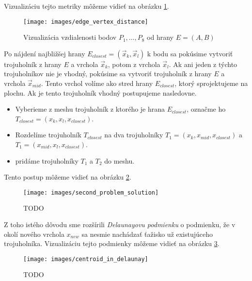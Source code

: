 \begin{enumerate}
{\begin{definition}
    \end{definition}

    Vizualizáciu tejto metriky môžeme vidieť na obrázku \ref{obr:edge_vertex_distance}.

    \begin{figure}
        \centerline{\texttt{[image: images/edge\_vertex\_distance]}}
        \caption[Vizualizácia vzdialenosti bodov $P_1, ..., P_8$ od hrany $E=(A,B)$]
        {Vizualizácia vzdialenosti bodov $P_1, ..., P_8$ od hrany $E=(A,B)$}
        \label{obr:edge_vertex_distance}
    \end{figure}

    Po nájdení najbližšej hrany $E_{closest} = (\overrightarrow{x}_k, \overrightarrow{x}_l)$ 
    k bodu sa pokúsime vytvoriť trojuholník z hrany $E$ a vrchola $\overrightarrow{x}_k$, potom z
    vrchola $\overrightarrow{x}_l$. Ak ani jeden z týchto trojuholníkov nie je vhodný, pokúsime sa 
    vytvoriť trojuholník z hrany $E$ a vrchola $\overrightarrow{x}_{mid}$. Tento vrchol 
    volíme ako stred hrany $E_{closest}$, ktorý sprojektujeme na plochu. Ak je tento trojuholník vhodný
    postupujeme nasledovne. 
    
    \begin{itemize}
    \item{
        Vyberieme z meshu trojuholník z ktorého je hrana $E_{closest}$, označme ho 
        $T_{closest}=(x_k, x_l, x_{closest})$.
    }
    \item{
        Rozdelíme trojuholník $T_{closest}$ na dva trojuholníky $T_1 = (x_k, x_{mid}, x_{closest})$ a
        $T_1 = (x_{mid}, x_l, x_{closest})$.
    }
    \item{
        pridáme trojuholníky $T_1$ a $T_2$ do meshu. 
    }
    \end{itemize}

    Tento postup môžeme vidieť na obrázku \ref{obr:second_problem_solution}.

    \begin{figure}
        \centerline{\texttt{[image: images/second\_problem\_solution]}}
        \caption[TODO]{TODO}
        \label{obr:second_problem_solution}
    \end{figure}

    Z toho istého dôvodu sme rozšírili \textit{Delaunayovu podmienku} o podmienku, že 
    v okolí nového vrchola $x_{new}$ sa nesmie nachádzať ťažisko už existujúceho trojuholníka.
    Vizualizáciu tejto podmienky môžeme vidieť na obrázku \ref{obr:centroid_in_delaunay}.

    \begin{figure}
        \centerline{\texttt{[image: images/centroid\_in\_delaunay]}}
        \caption[TODO]{TODO}
        \label{obr:centroid_in_delaunay}
    \end{figure}
}
\end{enumerate}

